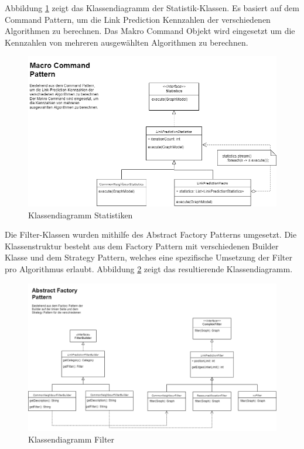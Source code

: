 Abbildung \ref{fig:class_statistic} zeigt das Klassendiagramm der Statistik-Klassen. Es basiert auf dem Command Pattern, um die Link Prediction Kennzahlen der verschiedenen Algorithmen zu berechnen. Das Makro Command Objekt wird eingesetzt um die Kennzahlen von mehreren ausgewählten Algorithmen zu berechnen.
\begin{figure}[h]
    \centering
    \includegraphics[width=\linewidth]{resources/class_Statistic.png}
    \caption{Klassendiagramm Statistiken}
    \label{fig:class_statistic}
\end{figure}

Die Filter-Klassen wurden mithilfe des Abstract Factory Patterns umgesetzt. Die Klassenstruktur besteht aus dem Factory Pattern mit verschiedenen Builder Klasse und dem Strategy Pattern, welches eine spezifische Umsetzung der Filter pro Algorithmus erlaubt. Abbildung \ref{fig:class_filter} zeigt das resultierende Klassendiagramm.
\begin{figure}[h]
    \centering
    \includegraphics[width=\linewidth]{resources/class_Filter.png}
    \caption{Klassendiagramm Filter}
    \label{fig:class_filter}
\end{figure}



